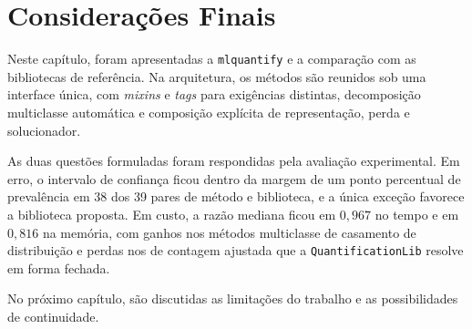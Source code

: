 \section{Considerações Finais}
\label{sec:consideracoes_finais_res}

Neste capítulo, foram apresentadas a \texttt{mlquantify} e a comparação com as
bibliotecas de referência. Na arquitetura, os métodos são reunidos sob uma interface
única, com \textit{mixins} e \textit{tags} para exigências distintas, decomposição
multiclasse automática e composição explícita de representação, perda e solucionador.

As duas questões formuladas foram respondidas pela avaliação experimental. Em erro, o
intervalo de confiança ficou dentro da margem de um ponto percentual de prevalência em
38 dos 39 pares de método e biblioteca, e a única exceção favorece a biblioteca proposta.
Em custo, a razão mediana ficou em $0{,}967$ no tempo e em $0{,}816$ na memória, com
ganhos nos métodos multiclasse de casamento de distribuição e perdas nos de contagem
ajustada que a \verb'QuantificationLib' resolve em forma fechada.

No próximo capítulo, são discutidas as limitações do trabalho e as possibilidades de
continuidade.
